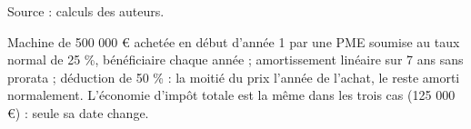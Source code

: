 Source : calculs des auteurs.\par Machine de 500 000 € achetée en début d'année 1 par une PME soumise au taux normal de 25 \%, bénéficiaire chaque année ; amortissement linéaire sur 7 ans sans prorata ; déduction de 50 \% : la moitié du prix l'année de l'achat, le reste amorti normalement. L'économie d'impôt totale est la même dans les trois cas (125 000 €) : seule sa date change.
